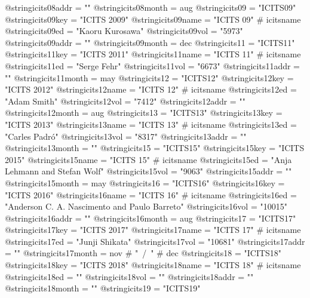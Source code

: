 @string{icits08addr =           ""}
@string{icits08month =          aug}
@string{icits09 =               "ICITS09"}
@string{icits09key =            "ICITS 2009"}
@string{icits09name =           "ICITS 09" # icitsname}
@string{icits09ed =             "Kaoru Kurosawa"}
@string{icits09vol =            "5973"}
@string{icits09addr =           ""}
@string{icits09month =          dec}
@string{icits11 =               "ICITS11"}
@string{icits11key =            "ICITS 2011"}
@string{icits11name =           "ICITS 11" # icitsname}
@string{icits11ed =             "Serge Fehr"}
@string{icits11vol =            "6673"}
@string{icits11addr =           ""}
@string{icits11month =          may}
@string{icits12 =               "ICITS12"}
@string{icits12key =            "ICITS 2012"}
@string{icits12name =           "ICITS 12" # icitsname}
@string{icits12ed =             "Adam Smith"}
@string{icits12vol =            "7412"}
@string{icits12addr =           ""}
@string{icits12month =          aug}
@string{icits13 =               "ICITS13"}
@string{icits13key =            "ICITS 2013"}
@string{icits13name =           "ICITS 13" # icitsname}
@string{icits13ed =             "Carles Padr{\'o}"}
@string{icits13vol =            "8317"}
@string{icits13addr =           ""}
@string{icits13month =          ""}
@string{icits15 =               "ICITS15"}
@string{icits15key =            "ICITS 2015"}
@string{icits15name =           "ICITS 15" # icitsname}
@string{icits15ed =             "Anja Lehmann and Stefan Wolf"}
@string{icits15vol =            "9063"}
@string{icits15addr =           ""}
@string{icits15month =          may}
@string{icits16 =               "ICITS16"}
@string{icits16key =            "ICITS 2016"}
@string{icits16name =           "ICITS 16" # icitsname}
@string{icits16ed =             "Anderson C. A. Nascimento and Paulo Barreto"}
@string{icits16vol =            "10015"}
@string{icits16addr =           ""}
@string{icits16month =          aug}
@string{icits17 =               "ICITS17"}
@string{icits17key =            "ICITS 2017"}
@string{icits17name =           "ICITS 17" # icitsname}
@string{icits17ed =             "Junji Shikata"}
@string{icits17vol =            "10681"}
@string{icits17addr =           ""}
@string{icits17month =          nov # "~/~" # dec}
@string{icits18 =               "ICITS18"}
@string{icits18key =            "ICITS 2018"}
@string{icits18name =           "ICITS 18" # icitsname}
@string{icits18ed =             ""}
@string{icits18vol =            ""}
@string{icits18addr =           ""}
@string{icits18month =          ""}
@string{icits19 =               "ICITS19"}
